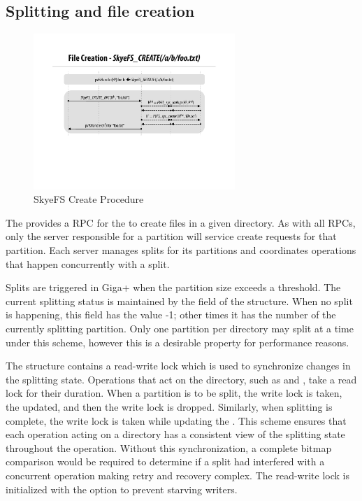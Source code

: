 \documentclass[onecolumn, 11pt, letterpaper]{article}
\begin{document}
\subsection{Splitting and file creation}
\begin{figure}
\begin{center}
\includegraphics[width=3in]{figure-create}
\end{center}
\caption{SkyeFS Create Procedure}
\end{figure}
The  provides a  RPC for the
 to create files in a given directory.  As with all
 RPCs, only the server responsible for a partition will
service create requests for that partition.  Each server manages splits for
its partitions and coordinates operations that happen concurrently with a
split.

Splits are triggered in Giga+ when the partition size exceeds a threshold.
The current splitting status is maintained by the 
field of the  structure.  When no split is happening,
this field has the value -1; other times it has the number of the currently
splitting partition.  Only one partition per directory may split at a
time under this scheme, however this is a desirable property for performance
reasons.

The  structure contains a read-write lock which is used
to synchronize changes in the splitting state.  Operations that act on the
directory, such as  and , take a read lock for their
duration.  When a partition is to be split, the write lock is taken, the
 updated, and then the write lock is dropped.
Similarly, when splitting is complete, the write lock is taken while updating
the .  This scheme ensures that each operation acting
on a directory has a consistent view of the splitting state 
throughout the operation.  Without this synchronization, a complete bitmap
comparison would be required to determine if a split had interfered with a
concurrent operation making retry and recovery complex.  The read-write lock
is initialized with the
 option to prevent
starving writers.
\end{document}
